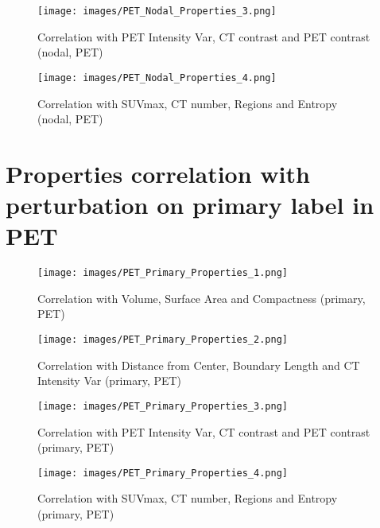 \begin{figure}[ht]
    \centering
    \texttt{[image: images/PET\_Nodal\_Properties\_3.png]}
    \caption{Correlation with PET Intensity Var, CT contrast and PET contrast (nodal, PET)}
\end{figure}

\begin{figure}[ht]
    \centering
    \texttt{[image: images/PET\_Nodal\_Properties\_4.png]}
    \caption{Correlation with SUVmax, CT number, Regions and Entropy (nodal, PET)}
\end{figure}

\clearpage
\section{Properties correlation with perturbation on primary label in PET}

\begin{figure}[ht]
    \centering
    \texttt{[image: images/PET\_Primary\_Properties\_1.png]}
    \caption{Correlation with Volume, Surface Area and Compactness (primary, PET)}
\end{figure}

\begin{figure}[ht]
    \centering
    \texttt{[image: images/PET\_Primary\_Properties\_2.png]}
    \caption{Correlation with Distance from Center, Boundary Length and CT Intensity Var (primary, PET)}
\end{figure}

\begin{figure}[ht]
    \centering
    \texttt{[image: images/PET\_Primary\_Properties\_3.png]}
    \caption{Correlation with PET Intensity Var, CT contrast and PET contrast (primary, PET)}
\end{figure}

\begin{figure}[ht]
    \centering
    \texttt{[image: images/PET\_Primary\_Properties\_4.png]}
    \caption{Correlation with SUVmax, CT number, Regions and Entropy (primary, PET)}
\end{figure}



